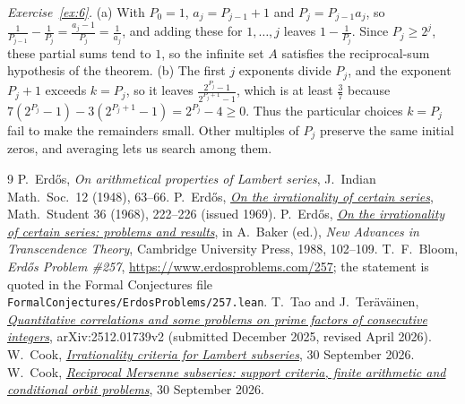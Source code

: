 \documentclass[10pt]{article}
\theoremstyle{plain}
\theoremstyle{definition}
\theoremstyle{remark}
\begin{document}
\begin{samepage}
\emph{Exercise~\ref{ex:6}.} (a) With $P_0=1$, $a_j=P_{j-1}+1$ and
$P_j=P_{j-1}a_j$, so
$\tfrac1{P_{j-1}}-\tfrac1{P_j}=\tfrac{a_j-1}{P_j}=\tfrac1{a_j}$, and
adding these for $1,\dots,j$ leaves $1-\tfrac1{P_j}$. Since $P_j\ge2^j$,
these partial sums tend to $1$, so the infinite set $A$ satisfies the
reciprocal-sum hypothesis of the theorem. (b) The first $j$ exponents
divide $P_j$, and the exponent $P_j+1$ exceeds $k=P_j$, so it leaves
$\tfrac{2^{P_j}-1}{2^{P_j+1}-1}$, which is at least $\tfrac37$ because
$7(2^{P_j}-1)-3(2^{P_j+1}-1)=2^{P_j}-4\ge0$. Thus the particular
choices $k=P_j$ fail to make the remainders small. Other multiples of
$P_j$ preserve the same initial zeros, and averaging lets us search
among them.\par
\end{samepage}

\endgroup

\begin{thebibliography}{9}
\setlength{\itemsep}{2pt}
\setlength{\parsep}{0pt}
\setlength{\parskip}{0pt}
 P.~Erd\H{o}s, \emph{On arithmetical properties of Lambert
 series}, J.~Indian Math.\ Soc.\ 12 (1948), 63--66.
 P.~Erd\H{o}s,
 \href{https://users.renyi.hu/~p_erdos/1969-09.pdf}{\emph{On the irrationality of
 certain series}}, Math.\ Student 36 (1968), 222--226 (issued 1969).
 P.~Erd\H{o}s,
 \href{https://users.renyi.hu/~p_erdos/1988-22.pdf}{\emph{On the irrationality of
 certain series: problems and results}}, in A.~Baker (ed.), \emph{New Advances
 in Transcendence Theory}, Cambridge University Press, 1988, 102--109.
 T.~F.~Bloom, \emph{Erd\H{o}s Problem \#257},
 \url{https://www.erdosproblems.com/257}; the statement is quoted in the Formal
 Conjectures file \texttt{FormalConjectures/ErdosProblems/257.lean}.
 T.~Tao and J.~Ter\"av\"ainen,
 \href{https://arxiv.org/abs/2512.01739v2}{\emph{Quantitative correlations and
 some problems on prime factors of consecutive integers}}, arXiv:2512.01739v2
 (submitted December 2025, revised April 2026).
 W.~Cook,
 \href{https://github.com/wcook04/plectis-erdos/blob/0064fc9b2a2693de97aebc8abec26090c3cd1095/paper/257/erdos-257-mersenne-support-subseries.pdf}{\emph{Irrationality
 criteria for Lambert subseries}}, 30 September 2026.
 W.~Cook,
 \href{https://github.com/wcook04/plectis-erdos/blob/0064fc9b2a2693de97aebc8abec26090c3cd1095/paper/257/erdos257-mersenne-reasoning-surface.pdf}{\emph{Reciprocal
 Mersenne subseries: support criteria, finite arithmetic and conditional orbit
 problems}}, 30 September 2026.
\end{thebibliography}
\end{document}
